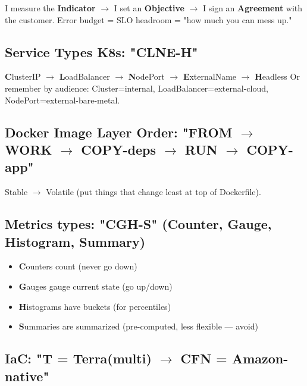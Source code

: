 \documentclass[11pt]{article}
\providecommand{\tightlist}{\setlength{\itemsep}{1pt}\setlength{\parskip}{0pt}}
\begin{document}
I measure the \textbf{Indicator} \(\rightarrow\) I set an \textbf{Objective} \(\rightarrow\) I sign an \textbf{Agreement} with the customer.
Error budget = SLO headroom = "how much you can mess up."

\subsection{Service Types K8s: "CLNE-H"}\label{service-types-k8s-clne-h}

\textbf{C}lusterIP \(\rightarrow\) \textbf{L}oadBalancer \(\rightarrow\) \textbf{N}odePort \(\rightarrow\) \textbf{E}xternalName \(\rightarrow\) \textbf{H}eadless
Or remember by audience: Cluster=internal, LoadBalancer=external-cloud, NodePort=external-bare-metal.

\subsection{\texorpdfstring{Docker Image Layer Order: "FROM \(\rightarrow\) WORK \(\rightarrow\) COPY-deps \(\rightarrow\) RUN \(\rightarrow\) COPY-app"}{Docker Image Layer Order: "FROM \textbackslash rightarrow WORK \textbackslash rightarrow COPY-deps \textbackslash rightarrow RUN \textbackslash rightarrow COPY-app"}}\label{docker-image-layer-order-from-rightarrow-work-rightarrow-copy-deps-rightarrow-run-rightarrow-copy-app}

Stable \(\rightarrow\) Volatile (put things that change least at top of Dockerfile).

\subsection{Metrics types: "CGH-S" (Counter, Gauge, Histogram, Summary)}\label{metrics-types-cgh-s-counter-gauge-histogram-summary}

\begin{itemize}
\tightlist
\item
  \textbf{C}ounters count (never go down)
\item
  \textbf{G}auges gauge current state (go up/down)
\item
  \textbf{H}istograms have buckets (for percentiles)
\item
  \textbf{S}ummaries are summarized (pre-computed, less flexible --- avoid)
\end{itemize}

\subsection{\texorpdfstring{IaC: "T = Terra(multi) \(\rightarrow\) CFN = Amazon-native"}{IaC: "T = Terra(multi) \textbackslash rightarrow CFN = Amazon-native"}}\label{iac-t--terramulti-rightarrow-cfn--amazon-native}
\end{document}
